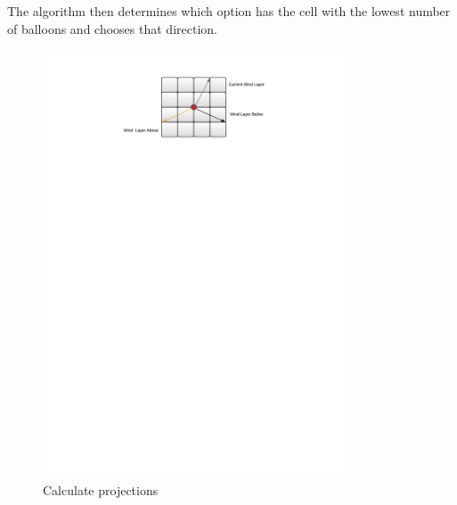 The algorithm then determines which option has the cell with the lowest number of balloons and chooses that direction.
\begin{figure}
\centering
\includegraphics[width=0.8\textwidth,trim= 4cm 23cm 4cm 1cm,clip]{graphics/Projections.pdf}
\caption{Calculate projections}
\label{fig:projections}
\end{figure}

